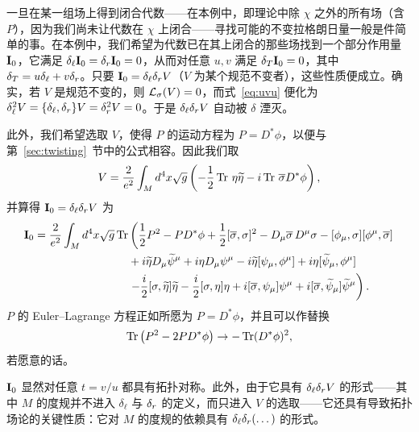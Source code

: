 一旦在某一组场上得到闭合代数——在本例中，即理论中除 $\chi$ 之外的所有场（含 $P$），因为我们尚未让代数在 $\chi$ 上闭合——寻找可能的不变拉格朗日量一般是件简单的事。在本例中，我们希望为代数已在其上闭合的那些场找到一个部分作用量 ${{{\mathbf{I}}}}_0$，它满足 $\delta_\ell{{{\mathbf{I}}}}_0=\delta_r{{{\mathbf{I}}}}_0=0$，从而对任意 $u,v$ 满足 $\delta_T{{{\mathbf{I}}}}_0=0$，其中 $\delta_T=u\delta_\ell+v\delta_r$。只要 ${{{\mathbf{I}}}}_0=\delta_\ell\delta_r V$（$V$ 为某个规范不变者），这些性质便成立。确实，若 $V$ 是规范不变的，则 ${{{\mathcal{L}}}}_\sigma(V)=0$，而式~\eqref{eq:uvu} 便化为 $\delta_\ell^2V=\{\delta_\ell,\delta_r\}V=\delta_r^2V=0$。于是 $\delta_\ell\delta_r V$ 自动被 $\delta$ 湮灭。

此外，我们希望选取 $V$，使得 $P$ 的运动方程为 $P=D^*\phi$，以便与第~\ref{sec:twisting}~节中的公式相容。因此我们取%
\setcounter{equation}{37}
\begin{equation}\label{eq:obo}
V={2\over e^2}\int_M
d^4x\sqrt g\left(-{1\over 2}\operatorname{Tr}\,\eta\widetilde\eta -i\operatorname{Tr}\,\overline\sigma
D^*\phi\right),
\end{equation}
并算得 ${{\mathbf{I}}}_0=\delta_\ell\delta_r V$ 为%
\setcounter{equation}{38}
\begin{equation}\label{eq:nobo}
\begin{aligned}{{{\mathbf{I}}}}_0= {2\over e^2}\int_Md^4x\sqrt g\operatorname{Tr}& \left({1\over 2}P^2
-PD^*\phi+{1\over 2}[\overline\sigma,\sigma]^2-
D_\mu\overline\sigma\,D^\mu\sigma
-[\phi_\mu,\sigma][\phi^\mu,\overline\sigma]\right.\\ & + i\widetilde\eta
D_\mu\widetilde\psi^\mu+i\eta
D_\mu\psi^\mu-i\widetilde\eta[\psi_\mu,\phi^\mu]+i\eta[\widetilde\psi_\mu,\phi^\mu]
\\ &\left.-{i\over 2}[\sigma,\widetilde\eta]\widetilde\eta -{i\over
2}[\sigma,\eta]\eta+i[\overline\sigma,\psi_\mu]\psi^\mu
+i[\overline\sigma,\widetilde\psi_\mu]\widetilde\psi^\mu\right).\\\end{aligned}
\end{equation}
$P$ 的 Euler--Lagrange 方程正如所愿为 $P=D^*\phi$，并且可以作替换%
\setcounter{equation}{39}
\begin{equation}\label{eq:olgog}
\operatorname{Tr}\left(
P^2-2PD^*\phi\right)\to-\operatorname{Tr} (D^*\phi)^2,
\end{equation}
若愿意的话。

${{{\mathbf{I}}}}_0$ 显然对任意 $t=v/u$ 都具有拓扑对称。此外，由于它具有 $\delta_\ell\delta_r V$ 的形式——其中 $M$ 的度规并不进入 $\delta_\ell$ 与 $\delta_r$ 的定义，而只进入 $V$ 的选取——它还具有导致拓扑场论的关键性质：它对 $M$ 的度规的依赖具有 $\delta_\ell\delta_r(\dots)$ 的形式。

